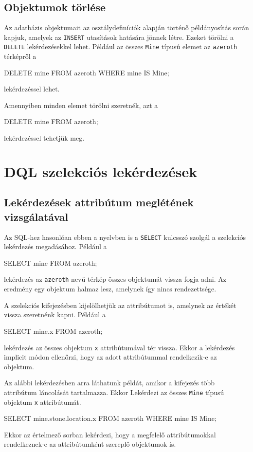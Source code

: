 \subsection{Objektumok törlése}

Az adatbázis objektumait az osztálydefiníciók alapján történő példányosítás során kapjuk, amelyek az \texttt{INSERT} utasítások hatására jönnek létre. Ezeket törölni a \texttt{DELETE} lekérdezésekkel lehet. Például az összes \texttt{Mine} típusú elemet az \texttt{azeroth} térképről a
\begin{sql}
DELETE mine FROM azeroth WHERE mine IS Mine;
\end{sql}
lekérdezéssel lehet.

Amennyiben minden elemet törölni szeretnék, azt a
\begin{sql}
DELETE mine FROM azeroth;
\end{sql}
lekérdezéssel tehetjük meg.

\section{DQL szelekciós lekérdezések}

\subsection{Lekérdezések attribútum meglétének vizsgálatával}

Az SQL-hez hasonlóan ebben a nyelvben is a \texttt{SELECT} kulcsszó szolgál a szelekciós lekérdezés megadásához. Például a
\begin{sql}
SELECT mine FROM azeroth;
\end{sql}
lekérdezés az \texttt{azeroth} nevű térkép összes objektumát vissza fogja adni. Az eredmény egy objektum halmaz lesz, amelynek így nincs rendezettsége.

A szelekciós kifejezésben kijelölhetjük az attribútumot is, amelynek az értékét vissza szeretnénk kapni. Például a
\begin{sql}
SELECT mine.x FROM azeroth;
\end{sql}
lekérdezés az összes objektum \texttt{x} attribútumával tér vissza. Ekkor a lekérdezés implicit módon ellenőrzi, hogy az adott attribútummal rendelkezik-e az objektum.

Az alábbi lekérdezésben arra láthatunk példát, amikor a kifejezés több attribútum láncolását tartalmazza. Ekkor Lekérdezi az összes \texttt{Mine} típusú objektum \texttt{x} attribútumát.
\begin{sql}
SELECT mine.stone.location.x FROM azeroth WHERE mine IS Mine;
\end{sql}
Ekkor az értelmező sorban lekérdezi, hogy a megfelelő attribútumokkal rendelkeznek-e az attribútumként szereplő objektumok is.

